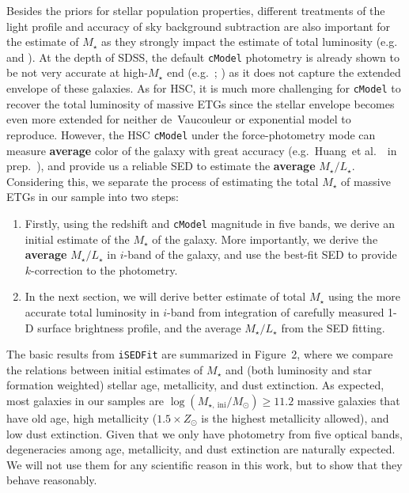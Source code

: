 \documentclass{emulateapj}
\def\etal{{\ et al.~}}
\def\mstar{{$M_{\star}$}}
\def\m2l{{$M_{\star}/L_{\star}$}}
\begin{document}
\begin{CJK*}{UTF8}{gbsn}
    Besides the priors for stellar population properties, different treatments of 
    the light profile and accuracy of sky background subtraction are also important
    for the estimate of \mstar{} as they strongly impact the estimate of total luminosity
    (e.g.\ \citealt{Bernardi2013} and \citealt{DSouza2015}).  
    At the depth of SDSS, the default \texttt{cModel} photometry is already shown to 
    be not very accurate at high-\mstar{} end (e.g.\ \citealt{Meert2015}; 
    \citealt{Bernardi2016a}) as it does not capture the extended envelope of these 
    galaxies. 
    As for HSC, it is much more challenging for \texttt{cModel} to recover the total 
    luminosity of massive ETGs since the stellar envelope becomes even more 
    extended for neither de~Vaucouleur or exponential model to reproduce.  
    However, the HSC \texttt{cModel} under the force-photometry mode can measure 
    \textbf{average} color of the galaxy with great accuracy (e.g.\ Huang\etal~in prep.~), 
    and provide us a reliable SED to estimate the \textbf{average} \m2l{}. 
    Considering this, we separate the process of estimating the total \mstar{} of 
    massive ETGs in our sample into two steps: 
    
    \begin{enumerate}
        \item Firstly, using the redshift and \texttt{cModel} magnitude in five bands, 
            we derive an initial estimate of the \mstar{} of the galaxy.  
            More importantly, we derive the \textbf{average} \m2l{} in $i$-band of the 
            galaxy, and use the best-fit SED to provide $k$-correction to the photometry.  
        \item In the next section, we will derive better estimate of total \mstar{} using 
            the more accurate total luminosity in $i$-band from integration of carefully 
            measured 1-D surface brightness profile, and the average \m2l{} from the SED
            fitting.  
    \end{enumerate}
    
    The basic results from \texttt{iSEDFit} are summarized in Figure~2, where we compare
    the relations between initial estimates of \mstar{} and (both luminosity and 
    star formation weighted) stellar age, metallicity, and dust extinction. 
    As expected, most galaxies in our samples are 
    $\log(M_{\star,\ \mathrm{ini}}/M_{\odot}) \geq 11.2$ massive galaxies that have 
    old age, high metallicity ($1.5 \times Z_{\odot}$ is the highest metallicity allowed), 
    and low dust extinction.  
    Given that we only have photometry from five optical bands, degeneracies among 
    age, metallicity, and dust extinction are naturally expected.  
    We will not use them for any scientific reason in this work, but to show that they
    behave reasonably.   


\end{CJK*}
\end{document}
